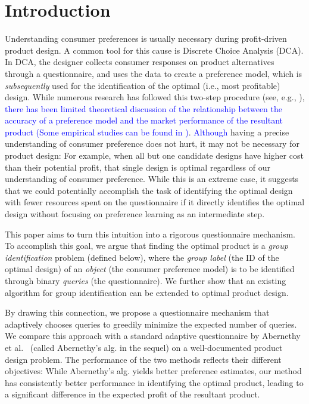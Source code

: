 \documentclass[onecolumn,11pt]{article}
\newcommand{\highlight}[1]{{\textcolor{blue}{{#1}}}}
\newcommand{\highlight}[1]{{{#1}}}
\begin{document}
\section{Introduction}
\label{sec:intro}
Understanding consumer preferences is usually necessary during profit-driven product design. A common tool for this cause is Discrete Choice Analysis (DCA). In DCA, the designer collects consumer responses on product alternatives through a questionnaire, and uses the data to create a preference model, which is  {\it subsequently} used for the identification of the optimal (i.e., most profitable) design. While numerous research has followed this two-step procedure (see, e.g., \cite{wassenaar2003approach, michalek2005linking, wassenaar2005enhancing,lewis2006decision, michalek2011enhancing,namwoo2014charging}), \highlight{there has been limited theoretical discussion of the relationship between the accuracy of a preference model and the market performance of the resultant product (Some empirical studies can be found in \cite{long2015should,shinexploring})}. \highlight{Although} having a precise understanding of consumer preference does not hurt, it may not be necessary for product design: For example, when all but one candidate designs have higher cost than their potential profit, that single design is optimal regardless of our understanding of consumer preference. While this is an extreme case, it suggests that we could potentially accomplish the task of identifying the optimal design with fewer resources spent on the questionnaire if it directly identifies the optimal design without focusing on preference learning as an intermediate step.

This paper aims to turn this intuition into a rigorous questionnaire mechanism. 
To accomplish this goal, we argue that finding the optimal product is a {\it group identification} problem (defined below), where the {\it group label} (the ID of the optimal design) of an {\it object} (the consumer preference model) is to be identified through binary {\it queries} (the questionnaire). We further show that an existing algorithm for group identification can be extended to optimal product design. 

By drawing this connection, we propose a questionnaire mechanism that adaptively chooses queries to greedily minimize the expected number of queries. We compare this approach with a standard adaptive questionnaire by Abernethy et al.~\cite{abernethy2008eliciting} (called Abernethy's alg. in the sequel) on a well-documented product design problem. The performance of the two methods reflects their different objectives: While Abernethy's alg. yields better preference estimates, our method has consistently better performance in identifying the optimal product, leading to a significant difference in the expected profit of the resultant product.    
\end{document}
